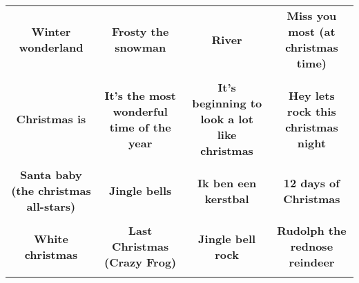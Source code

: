 \documentclass[12pt]{article} \usepackage{eso-pic, graphicx}
\newcommand{\background}[1]{%
\AddToShipoutPictureBG*{\texttt{[image: \#1]}}
}
\begin{document}
\tabcolsep=30.2pt \renewcommand{\arraystretch}{4.5}   \vspace*{4.3cm} \begin{center}  \begin{tabular}{c c c c}
\parbox{3cm}{\centering \textbf{Winter wonderland}}& 
\parbox{3cm}{\centering \textbf{Frosty the snowman}}& 
\parbox{3cm}{\centering \textbf{River}}& 
\parbox{3cm}{\centering \textbf{Miss you most (at christmas time)}}\\ \\ 
\parbox{3cm}{\centering \textbf{Christmas is}}& 
\parbox{3cm}{\centering \textbf{It’s the most wonderful time of the year}}& 
\parbox{3cm}{\centering \textbf{It’s beginning to look a lot like christmas}}& 
\parbox{3cm}{\centering \textbf{Hey lets rock this christmas night}}\\ \\ 
\parbox{3cm}{\centering \textbf{Santa baby (the christmas all-stars)}}& 
\parbox{3cm}{\centering \textbf{Jingle bells}}& 
\parbox{3cm}{\centering \textbf{Ik ben een kerstbal}}& 
\parbox{3cm}{\centering \textbf{12 days of Christmas}}\\ \\ 
\parbox{3cm}{\centering \textbf{White christmas}}& 
\parbox{3cm}{\centering \textbf{Last Christmas (Crazy Frog)}}& 
\parbox{3cm}{\centering \textbf{Jingle bell rock}}& 
\parbox{3cm}{\centering \textbf{Rudolph the rednose reindeer}}\\ \\ 
\end{tabular} \background{discobingo.pdf} \end{center} 
\end{document}
